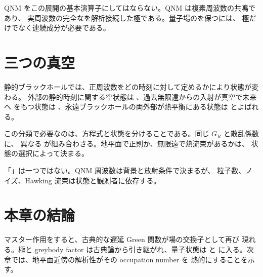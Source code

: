QNM をこの展開の基本演算子にしてはならない。QNM は複素周波数の共鳴であり、
実周波数の完全なを解析接続した極である。量子場のを保つには、
極だけでなく連続成分が必要である。

\section{三つの真空}

静的ブラックホールでは、正周波数をどの時刻に対して定めるかにより状態が変わる。
外部の静的時刻に関する空状態は 、過去無限遠からの入射が真空で未来へ
をもつ状態は 、永遠ブラックホールの両外部が熱平衡にある状態は
とよばれる。

この分類で必要なのは、方程式と状態を分けることである。同じ $G_R$ と散乱係数に、
異なる  が組み合わさる。地平面で正則か、無限遠で熱流束があるかは、
状態の選択によって決まる。

\begin{warningbox}
「」は一つではない。QNM 周波数は背景と放射条件で決まるが、
粒子数、ノイズ、Hawking 流束は状態と観測者に依存する。
\end{warningbox}

\section{本章の結論}

マスター作用をすると、古典的な遅延 Green 関数が場の交換子として再び
現れる。極と greybody factor は古典論から引き継がれ、量子状態は と
 に入る。次章では、地平面近傍の解析性がその occupation number を
熱的にすることを示す。
